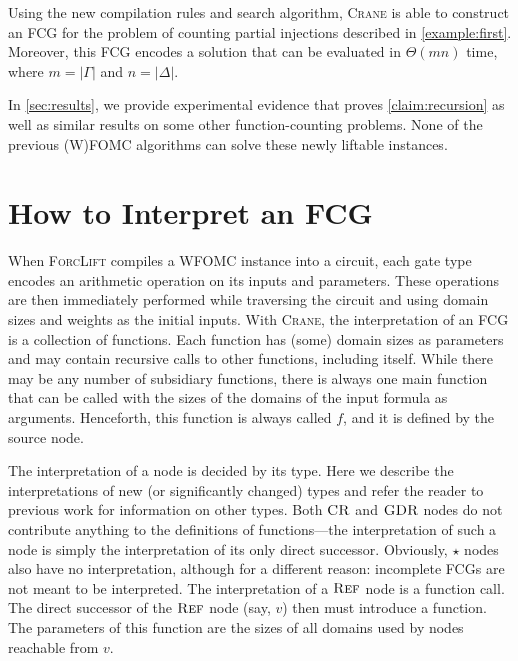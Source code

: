 \begin{claim}\label{claim:recursion}
  Using the new compilation rules and search algorithm, \textsc{Crane} is able
  to construct an FCG for the problem of counting partial injections described
  in \cref{example:first}. Moreover, this FCG encodes a solution that can be
  evaluated in $\Theta(mn)$ time, where $m = |\Gamma|$ and $n = |\Delta|$.
\end{claim}

In \cref{sec:results}, we provide experimental evidence that proves
\cref{claim:recursion} as well as similar results on some other
function-counting problems. None of the previous (W)FOMC algorithms
\citep{DBLP:conf/ijcai/BroeckTMDR11,DBLP:journals/cacm/GogateD16,DBLP:conf/kr/KazemiP16}
can solve these newly liftable instances.

\section{How to Interpret an FCG}\label{sec:interpret}

When \textsc{ForcLift} \citep{DBLP:conf/ijcai/BroeckTMDR11} compiles a WFOMC
instance into a circuit, each gate type encodes an arithmetic operation on its
inputs and parameters. These operations are then immediately performed while
traversing the circuit and using domain sizes and weights as the initial inputs.
With \textsc{Crane}, the interpretation of an FCG is a collection of functions.
Each function has (some) domain sizes as parameters and may contain recursive
calls to other functions, including itself. While there may be any number of
subsidiary functions, there is always one main function that can be called with
the sizes of the domains of the input formula as arguments. Henceforth, this
function is always called $f$, and it is defined by the source node.

The interpretation of a node is decided by its type. Here we describe the
interpretations of new (or significantly changed) types and refer the reader to
previous work \citep{DBLP:conf/ijcai/BroeckTMDR11} for information on other
types. Both $\operatorname{\textsc{CR}}$ and $\operatorname{\textsc{GDR}}$ nodes do not contribute anything to the definitions
of functions---the interpretation of such a node is simply the interpretation of
its only direct successor. Obviously, $\star$ nodes also have no interpretation,
although for a different reason: incomplete FCGs are not meant to be
interpreted. The interpretation of a $\operatorname{\textsc{Ref}}$ node is a function call. The direct
successor of the $\operatorname{\textsc{Ref}}$ node (say, $v$) then must introduce a function. The
parameters of this function are the sizes of all domains used by nodes reachable
from $v$.

